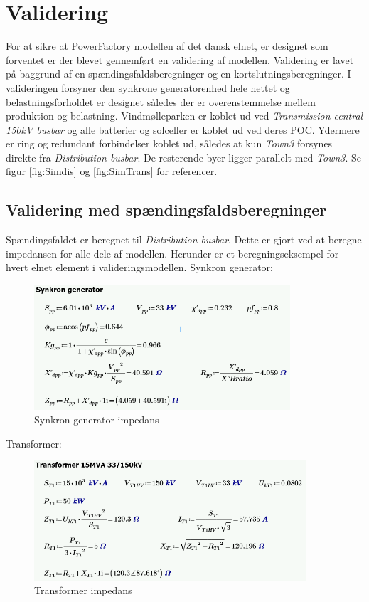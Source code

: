 
\label{Validering}
\section{Validering}

For at sikre at PowerFactory modellen af det dansk elnet, er designet som forventet er der blevet gennemført en validering af modellen. Validering er lavet på baggrund af en spændingsfaldsberegninger og en kortslutningsberegninger. I valideringen forsyner den synkrone generatorenhed hele nettet og belastningsforholdet er designet således der er overenstemmelse mellem produktion og belastning. Vindmølleparken er koblet ud ved \textit{Transmission central 150kV busbar} og alle batterier og solceller er koblet ud ved deres POC. Ydermere er ring og redundant forbindelser koblet ud, således at kun \textit{Town3} forsynes direkte fra \textit{Distribution busbar}. De resterende byer ligger parallelt med \textit{Town3}. Se figur \ref{fig:Simdis} og \ref{fig:SimTrans} for referencer.

\subsection{Validering med spændingsfaldsberegninger}
Spændingsfaldet er beregnet til \textit{Distribution busbar}. Dette er gjort ved at beregne impedansen for alle dele af modellen. Herunder er et beregningseksempel for hvert elnet element i valideringsmodellen.
\newpage
Synkron generator:
\begin{figure}[H] %
	\centering
	\includegraphics[width=0.85\textwidth]{figurer/Synkron_generator_validering}
	\caption{Synkron generator impedans}
	\label{fig:SGimpedans}
\end{figure}

Transformer:
\begin{figure}[H] %
	\centering
	\includegraphics[width=0.9\textwidth]{figurer/Transformer_validering}
	\caption{Transformer impedans}
	\label{fig:Trafoimpedans}
\end{figure}

